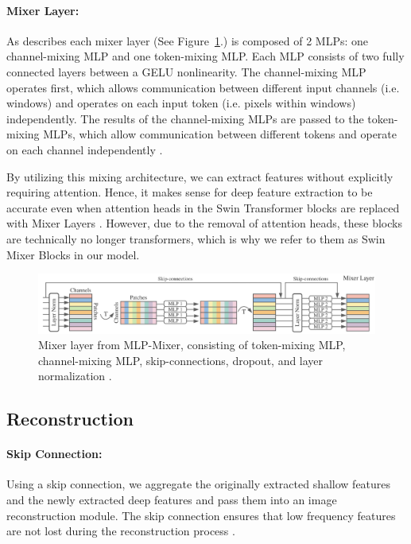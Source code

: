 \documentclass{article}
\begin{document}
\paragraph{Mixer Layer:} As \citet{MLPMixer} describes each mixer layer (See Figure~\ref{fig:mixer}.) is composed of 2 MLPs: one channel-mixing MLP and one token-mixing MLP. Each MLP consists of two fully connected layers between a GELU nonlinearity. The channel-mixing MLP operates first, which allows communication between different input channels (i.e. windows) and operates on each input token (i.e. pixels within windows) independently. The results of the channel-mixing MLPs are passed to the token-mixing MLPs, which allow communication between different tokens and operate on each channel independently \citep{MLPMixer}.

By utilizing this mixing architecture, we can extract features without explicitly requiring attention. Hence, it makes sense for deep feature extraction to be accurate even when attention heads in the Swin Transformer blocks are replaced with Mixer Layers \citep{MLPMixer}. However, due to the removal of attention heads, these blocks are technically no longer transformers, which is why we refer to them as Swin Mixer Blocks in our model.

\begin{figure}
    \centering
    \includegraphics[width=\textwidth]{mixer-layer.png}
    \caption{Mixer layer from MLP-Mixer, consisting of token-mixing MLP, channel-mixing MLP, skip-connections, dropout, and layer normalization \citep{MLPMixer}.}
    \label{fig:mixer}
\end{figure}

\subsection{Reconstruction}

\paragraph{Skip Connection:} Using a skip connection, we aggregate the originally extracted shallow features and the newly extracted deep features and pass them into an image reconstruction module. The skip connection ensures that low frequency features are not lost during the reconstruction process \citep{SwinIR}.
\end{document}
